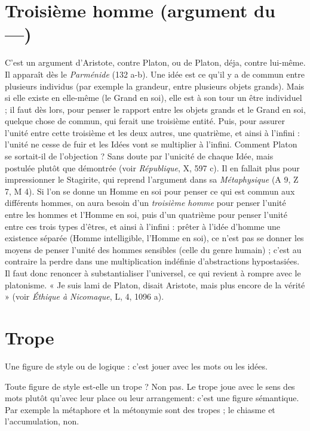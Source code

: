 \section{Troisième homme (argument du —)}
C’est un argument d’Aristote,
contre Platon, ou de
Platon, déja, contre lui-même. Il apparaît dès le {\it Parménide} (132 a-b). Une idée
est ce qu’il y a de commun entre plusieurs individus (par exemple la grandeur,
entre plusieurs objets grands). Mais si elle existe en elle-même (le Grand en soi),
elle est à son tour un être individuel ; il faut dès lors, pour penser le rapport entre
les objets grands et le Grand en soi, quelque chose de commun, qui ferait une
troisième entité. Puis, pour assurer l’unité entre cette troisième et les deux autres,
une quatrième, et ainsi à l'infini : l'unité ne cesse de fuir et les Idées vont se multiplier
à l'infini. Comment Platon se sortait-il de l’objection ? Sans doute par
l’unicité de chaque Idée, mais postulée plutôt que démontrée (voir {\it République}, X,
597 c). Il en fallait plus pour impressionner le Stagirite, qui reprend l’argument
dans sa {\it Métaphysique} (A 9, Z 7, M 4). Si l’on se donne un Homme en soi pour
penser ce qui est commun aux différents hommes, on aura besoin d’un {\it troisième
homme} pour penser l’unité entre les hommes et l'Homme en soi, puis d’un quatrième
pour penser l’unité entre ces trois types d’êtres, et ainsi à l'infini : prêter à
l’idée d’homme une existence séparée (Homme intelligible, l'Homme en soi), ce
n’est pas se donner les moyens de penser l’unité des hommes sensibles (celle du
genre humain) ; c’est au contraire la perdre dans une multiplication indéfinie
d’abstractions hypostasiées. Il faut donc renoncer à substantialiser l’universel, ce
qui revient à rompre avec le platonisme. « Je suis lami de Platon, disait Aristote,
mais plus encore de la vérité » (voir {\it Éthique à Nicomaque}, L, 4, 1096 a).

\section{Trope}
Une figure de style ou de logique : c’est jouer avec les mots ou les
idées.

Toute figure de style est-elle un trope ? Non pas. Le trope joue avec le sens
des mots plutôt qu'avec leur place ou leur arrangement: c’est une figure
sémantique. Par exemple la métaphore et la métonymie sont des tropes ; le
chiasme et l’accumulation, non.

